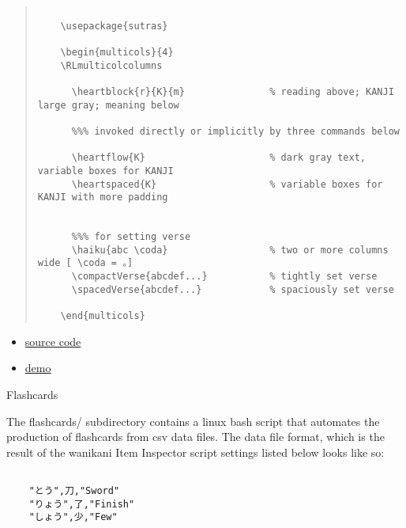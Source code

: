 \documentclass[letterpaper]{article}
\begin{document}
	\begin{quotation}
		
	\begin{verbatim}
	
	\usepackage{sutras}
	
	\begin{multicols}{4}
	\RLmulticolcolumns
	
	  \heartblock{r}{K}{m}               % reading above; KANJI large gray; meaning below
	
	  %%% invoked directly or implicitly by three commands below
	  
	  \heartflow{K}                      % dark gray text, variable boxes for KANJI 
	  \heartspaced{K}                    % variable boxes for KANJI with more padding
	 
	  
	  %%% for setting verse
	  \haiku{abc \coda}                  % two or more columns wide [ \coda = 。]
	  \compactVerse{abcdef...}           % tightly set verse
	  \spacedVerse{abcdef...}            % spaciously set verse
	
	\end{multicols}
	\end{verbatim}
	
\end{quotation}
	
	\vspace*{1cm}
 
	\begin{itemize}
		
			\item[] {\Large 
			 \href{https://github.com/gwmatthews/TheFourVows}{source code}}
			 \item[] {\Large 
			 	\href{https://gwmatthews.github.io/the-four-vows.pdf}{demo}}
		
	\end{itemize}
	\vfill\eject\pagebreak
	
	
	
	{\LARGE Flashcards}
	
	\vspace*{2cm}
	
	The flashcards/ subdirectory contains a linux bash script that automates the production of flashcards from csv data files. The data file format, which is the result of the wanikani Item Inspector script settings listed below looks like so:
	
	\begin{verbatim}
	
	"とう",刀,"Sword"
	"りょう",了,"Finish"
	"しょう",少,"Few"
	
	\end{verbatim}
	
\end{document}
